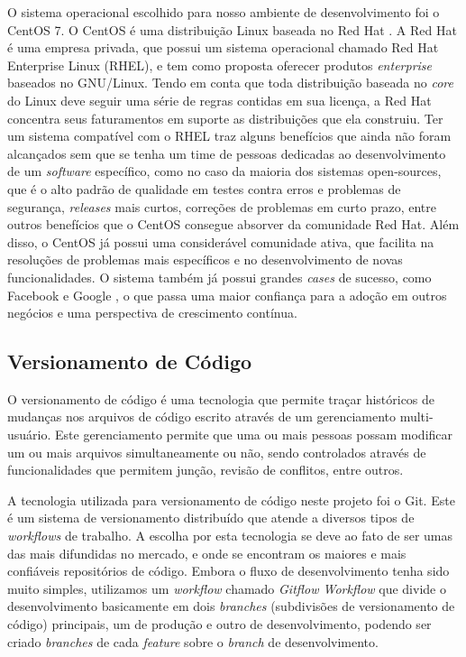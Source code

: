 O sistema operacional escolhido para nosso ambiente de desenvolvimento foi o CentOS 7. O CentOS é uma distribuição Linux baseada no Red Hat \cite{centos-redhat-based}. A Red Hat é uma empresa privada, que possui um sistema operacional chamado Red Hat Enterprise Linux (RHEL), e tem como proposta oferecer produtos \textit{enterprise} baseados no GNU/Linux. Tendo em conta que toda distribuição baseada no \textit{core} do Linux deve seguir uma série de regras contidas em sua licença, a Red Hat concentra seus faturamentos em suporte as distribuições que ela construiu. Ter um sistema compatível com o RHEL traz alguns benefícios que ainda não foram alcançados sem que se tenha um time de pessoas dedicadas ao desenvolvimento de um \textit{software} específico, como no caso da maioria dos sistemas open-sources, que é o alto padrão de qualidade em testes contra erros e problemas de segurança, \textit{releases} mais curtos, correções de problemas em curto prazo, entre outros benefícios que o CentOS consegue absorver da comunidade Red Hat. Além disso, o CentOS já possui uma considerável comunidade ativa, que facilita na resoluções de problemas mais específicos e no desenvolvimento de novas funcionalidades. O sistema também já possui grandes \textit{cases} de sucesso, como Facebook \cite{facebook-distro} e Google \cite{google-redhat}, o que passa uma maior confiança para a adoção em outros negócios e uma perspectiva de crescimento contínua.

\subsection{Versionamento de Código}
O versionamento de código é uma tecnologia que permite traçar históricos de mudanças nos arquivos de código escrito através de um gerenciamento multi-usuário. Este gerenciamento permite que uma ou mais pessoas possam modificar um ou mais arquivos simultaneamente ou não, sendo controlados através de funcionalidades que permitem junção, revisão de conflitos, entre outros.

A tecnologia utilizada para versionamento de código neste projeto foi o Git. Este é um sistema de versionamento distribuído que atende a diversos tipos de \textit{workflows} de trabalho. A escolha por esta tecnologia se deve ao fato de ser umas das mais difundidas no mercado, e onde se encontram os maiores e mais confiáveis repositórios de código. Embora o fluxo de desenvolvimento tenha sido muito simples, utilizamos um \textit{workflow} chamado \textit{Gitflow Workflow} \cite{gitflow} que divide o desenvolvimento basicamente em dois \textit{branches} (subdivisões de versionamento de código) principais, um de produção e outro de desenvolvimento, podendo ser criado \textit{branches} de cada \textit{feature} sobre o \textit{branch} de desenvolvimento. 

